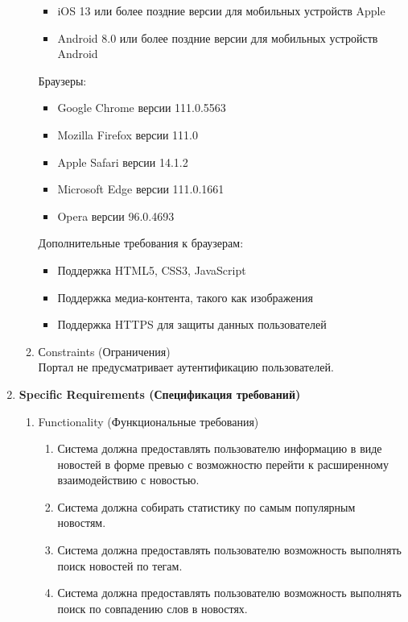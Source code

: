 \begin{enumerate}
\begin{enumerate}[label=2.\arabic*]
\begin{itemize}
            \item iOS 13 или более поздние версии для мобильных устройств Apple
            \item Android 8.0 или более поздние версии для мобильных устройств Android
        \end{itemize}
        \quad Браузеры:
        \begin{itemize}
            \item Google Chrome версии 111.0.5563
            \item Mozilla Firefox версии 111.0
            \item Apple Safari версии 14.1.2
            \item Microsoft Edge версии 111.0.1661
            \item Opera версии 96.0.4693
        \end{itemize}
        \quad Дополнительные требования к браузерам:
        \begin{itemize}
            \item Поддержка HTML5, CSS3, JavaScript
            \item Поддержка медиа-контента, такого как изображения
            \item Поддержка HTTPS для защиты данных пользователей
        \end{itemize}
        \item Сonstraints (Ограничения) \\
        Портал не предусматривает аутентификацию пользователей.
    \end{enumerate}
    \BgThispage
    \item \textbf{Specific Requirements (Спецификация требований)}
    \begin{enumerate}[label=3.\arabic*]
        \item Functionality (Функциональные требования)
        \begin{enumerate}[label=3.1.\arabic*]
            \item Система должна предоставлять пользователю информацию в виде новостей в форме превью с возможностю перейти к расширенному взаимодействию с новостью.
            \item Система должна собирать статистику по самым популярным новостям.
            \item Система должна предоставлять пользователю возможность выполнять поиск новостей по тегам.
            \item Система должна предоставлять пользователю возможность выполнять поиск по совпадению слов в новостях.

\end{enumerate}
\end{enumerate}
\end{enumerate}
